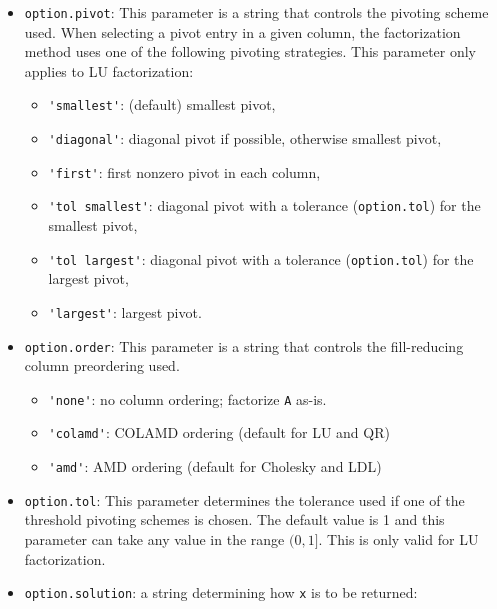 \documentclass[12pt,oneside]{book}
\theoremstyle{definition}
\begin{document}
\begin{itemize}
\item \verb|option.pivot|: This parameter is a string that controls the
pivoting scheme used.  When selecting a pivot entry in a given column, the
factorization method uses one of the following pivoting strategies. This parameter only applies to LU factorization:

    \begin{itemize}
    \item \verb|'smallest'|: (default) smallest pivot,
    \item \verb|'diagonal'|: diagonal pivot if possible, otherwise smallest pivot,
    \item \verb|'first'|: first nonzero pivot in each column,
    \item \verb|'tol smallest'|: diagonal pivot with a tolerance (\verb|option.tol|)
        for the smallest pivot,
    \item \verb|'tol largest'|: diagonal pivot with a tolerance (\verb|option.tol|)
        for the largest pivot,
    \item \verb|'largest'|: largest pivot.
    \end{itemize}
    
\item \verb|option.order|: This parameter is a string that controls the
fill-reducing column preordering used.

    \begin{itemize}
    \item \verb|'none'|: no column ordering; factorize \verb'A' as-is.
    \item \verb|'colamd'|: COLAMD ordering (default for LU and QR)
    \item \verb|'amd'|: AMD ordering (default for Cholesky and LDL)
    \end{itemize}

\item \verb|option.tol|: This parameter determines the tolerance used if one of
the threshold pivoting schemes is chosen. The default value is 1 and this
parameter can take any value in the range $(0,1]$. This is only valid
for LU factorization.

\item \verb|option.solution|:
    a string determining how \verb|x| is to be returned:


\end{itemize}
\end{document}
